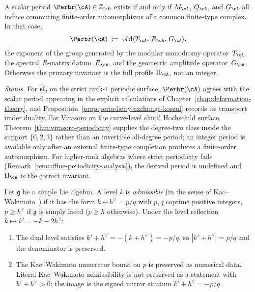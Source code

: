 \begin{definition}
\label{def:derived-scalar-period}
A scalar period $\Perbr(\cA) \in \mathbb{Z}_{>0}$ exists if and
only if $M_{\cA}$, $Q_{\cA}$, and $G_{\cA}$ all induce commuting
finite-order automorphisms of a common finite-type complex.
In that case,
\[
\Perbr(\cA)
\;:=\;
\operatorname{ord}\langle T_{\cA},\, R_{\cA},\, G_{\cA} \rangle,
\]
the exponent of the group generated by the modular monodromy
operator~$T_{\cA}$, the spectral $R$-matrix datum~$R_{\cA}$,
and the geometric amplitude operator~$G_{\cA}$.
Otherwise the primary invariant is the full profile
$\Pi_{\cA}$, not an integer.

\smallskip\noindent
\emph{Status.}
For $\widehat{\mathfrak{sl}}_2$ on the strict rank-$1$ periodic
surface, $\Perbr(\cA)$ agrees with the scalar period appearing in the
explicit calculations of Chapter~\ref{chap:deformation-theory}, and
Proposition~\ref{prop:periodicity-exchange-koszul} records its
transport under duality.  For Virasoro on the curve-level chiral
Hochschild surface, Theorem~\ref{thm:virasoro-periodicity} supplies
the degree-two class inside the support $\{0,2,3\}$ rather than an
invertible all-degree period;
an integer period is available only after an external finite-type
completion produces a finite-order automorphism. For
higher-rank algebras where strict periodicity fails
(Remark~\ref{rem:affine-periodicity-analysis}), the derived
period is undefined and $\Pi_{\cA}$ is the correct invariant.
\end{definition}

\begin{proposition}
\label{prop:admissible-levels-permuted}
Let $\mathfrak{g}$ be a simple Lie algebra. A level $k$ is \emph{admissible}
\textup{(}in the sense of Kac--Wakimoto~\cite{KW88}\textup{)} if it has the form
$k + h^\vee = p/q$ with $p,q$ coprime positive integers,
$p \geq h^\vee$ if $\mathfrak{g}$ is simply laced \textup{(}$p \geq h$ otherwise\textup{)}.
Under the level reflection $k \mapsto k' = -k - 2h^\vee$:
\begin{enumerate}[label=\textup{(\roman*)}]
\item The dual level satisfies $k' + h^\vee = -(k + h^\vee) = -p/q$,
so $|k' + h^\vee| = p/q$ and the denominator is preserved.
\item The Kac--Wakimoto numerator bound on $p$ is preserved as
numerical data.  Literal Kac--Wakimoto admissibility is not preserved
as a statement with $k'+h^\vee>0$; the image is the signed mirror
stratum $k'+h^\vee=-p/q$.
\end{enumerate}
\end{proposition}

